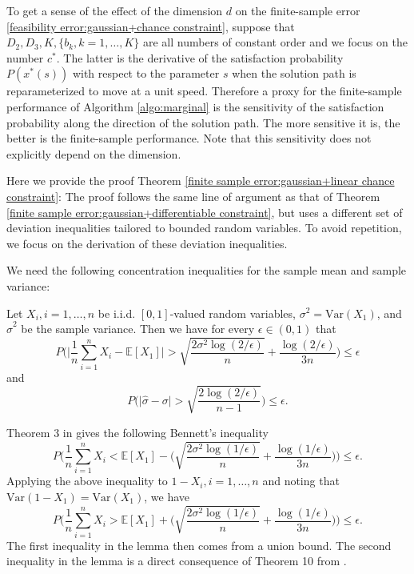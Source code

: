 \documentclass[mnsc,blindrev]{informs4} %
\begin{document}
To get a sense of the effect of the dimension $d$ on the finite-sample error \eqref{feasibility error:gaussian+chance constraint}, suppose  that $D_2,D_3,K,\{b_k,k=1,\ldots,K\}$ are all numbers of constant order and we focus on the number $c^*$. The latter is the derivative of the satisfaction probability $P(x^*(s))$ with respect to the parameter $s$ when the solution path is reparameterized to move at a unit speed. Therefore a proxy for the finite-sample performance of Algorithm \ref{algo:marginal} is the sensitivity of the satisfaction probability along the direction of the solution path. The more sensitive it is, the better is the finite-sample performance. Note that this sensitivity does not explicitly depend on the dimension.

Here we provide the proof Theorem \ref{finite sample error:gaussian+linear chance constraint}:
The proof follows the same line of argument as that of Theorem \ref{finite sample error:gaussian+differentiable constraint}, but uses a different set of deviation inequalities tailored to bounded random variables. To avoid repetition, we focus on the derivation of these deviation inequalities.

We need the following concentration inequalities for the sample mean and sample variance:
\begin{lemma}\label{Bennett's inequality}
Let $X_i,i=1,\ldots,n$ be i.i.d. $[0,1]$-valued random variables, $\sigma^2=\mathrm{Var}(X_1)$, and $\hat \sigma^2$ be the sample variance. Then we have for every $\epsilon\in (0,1)$ that
\begin{equation*}
    P\Big(\big\rvert\frac{1}{n}\sum_{i=1}^nX_i- \mathbb E[X_1]\big\rvert>\sqrt{\frac{2\sigma^2\log(2/\epsilon)}{n}}+\frac{\log(2/\epsilon)}{3n}\Big)\leq \epsilon
\end{equation*}
and
\begin{equation*}
    P\Big(\lvert \hat\sigma -\sigma\rvert>\sqrt{\frac{2\log(2/\epsilon)}{n-1}}\Big)\leq \epsilon.
\end{equation*}
\end{lemma}
Theorem 3 in \cite{maurer2009empirical} gives the following Bennett's inequality
\begin{equation*}
    P\Big(\frac{1}{n}\sum_{i=1}^nX_i< \mathbb E[X_1]-\big(\sqrt{\frac{2\sigma^2\log(1/\epsilon)}{n}}+\frac{\log(1/\epsilon)}{3n}\big)\Big)\leq \epsilon.
\end{equation*}
Applying the above inequality to $1-X_i,i=1,\ldots,n$ and noting that $\mathrm{Var}(1-X_1)=\mathrm{Var}(X_1)$, we have
\begin{equation*}
    P\Big(\frac{1}{n}\sum_{i=1}^nX_i> \mathbb E[X_1]+\big(\sqrt{\frac{2\sigma^2\log(1/\epsilon)}{n}}+\frac{\log(1/\epsilon)}{3n}\big)\Big)\leq \epsilon.
\end{equation*}
The first inequality in the lemma then comes from a union bound. The second inequality in the lemma is a direct consequence of Theorem 10 from \cite{maurer2009empirical}.\hfill\Halmos
\end{document}
